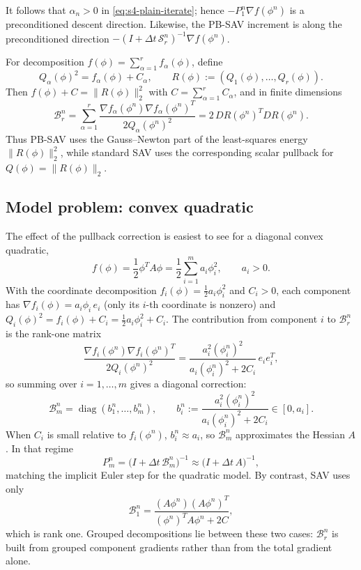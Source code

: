 \documentclass[10pt,onefignum,onetabnum,hidelinks]{siamart251216}
\begin{document}
It follows that \(\alpha_n>0\) in \eqref{eq:s4-plain-iterate}; hence
\(-P_1^n\nabla f(\phi^n)\) is a preconditioned descent direction. Likewise,
the PB-SAV increment is along the preconditioned direction
\(-(I+\Delta t\,\mathcal S_r^n)^{-1}\nabla f(\phi^n)\).

For decomposition \(f(\phi)=\sum_{\alpha=1}^r f_\alpha(\phi)\), define
\[
Q_\alpha(\phi)^2=f_\alpha(\phi)+C_\alpha,
\qquad
R(\phi):=(Q_1(\phi),\ldots,Q_r(\phi)).
\]
Then \(f(\phi)+C=\|R(\phi)\|_2^2\) with $C=\sum_{\alpha=1}^r C_\alpha$, and in finite dimensions
\[
\mathcal B_r^n
=
\sum_{\alpha=1}^r
\frac{\nabla f_\alpha(\phi^n)\nabla f_\alpha(\phi^n)^T}
{2Q_\alpha(\phi^n)^2}=
2\,DR(\phi^n)^TDR(\phi^n).
\]
Thus PB-SAV uses the Gauss--Newton part of the least-squares energy
\(\|R(\phi)\|_2^2\), while standard SAV uses the corresponding scalar pullback
for \(Q(\phi)=\|R(\phi)\|_2\).

\subsection{Model problem: convex quadratic}
\label{subsec:s4-convex-quadratic}

The effect of the pullback correction is easiest to see for a diagonal convex quadratic,
\begin{equation}
f(\phi)=\frac{1}{2}\phi^TA\phi
=\frac{1}{2}\sum_{i=1}^m a_i \phi_i^2,
\qquad
a_i>0.
\label{eq:s4-quadratic}
\end{equation}
With the coordinate decomposition $f_i(\phi)=\tfrac12 a_i \phi_i^2$ and $C_i>0$, each component has $\nabla f_i(\phi)=a_i\phi_i\,e_i$ (only its $i$-th coordinate is nonzero) and $Q_i(\phi)^2=f_i(\phi)+C_i=\tfrac12 a_i\phi_i^2+C_i$. The contribution from component $i$ to $\mathcal B_r^n$ is the rank-one matrix
\[
\frac{\nabla f_i(\phi^n)\nabla f_i(\phi^n)^T}{2Q_i(\phi^n)^2}
=
\frac{a_i^2(\phi_i^n)^2}{a_i(\phi_i^n)^2+2C_i}\,e_i e_i^T,
\]
so summing over $i=1,\dots,m$ gives a diagonal correction:
\begin{equation}
\mathcal B_m^n
=
\operatorname{diag}(b_1^n,\dots,b_m^n),
\qquad
b_i^n:=
\frac{a_i^2(\phi_i^n)^2}{a_i(\phi_i^n)^2+2C_i}
\in[0,a_i].
\label{eq:s4-quadratic-Br}
\end{equation}
When $C_i$ is small relative to $f_i(\phi^n)$, $b_i^n\approx a_i$, so $\mathcal B_m^n$ approximates the Hessian $A$. In that regime
\[
P_m^n
=
\bigl(I+\Delta t\,\mathcal B_m^n\bigr)^{-1}
\approx
\bigl(I+\Delta t\,A\bigr)^{-1},
\]
matching the implicit Euler step for the quadratic model. By contrast, SAV uses only
\begin{equation}
\mathcal B_1^n
=
\frac{(A\phi^n)(A\phi^n)^T}{(\phi^n)^TA\phi^n+2C},
\label{eq:s4-quadratic-B1}
\end{equation}
which is rank one. Grouped decompositions lie between these two cases: $\mathcal B_r^n$ is built from grouped component gradients rather than from the total gradient alone.
\end{document}

